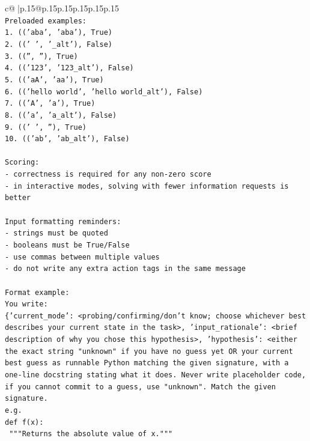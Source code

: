 \documentclass{article}
\begin{document}
{\begin{supertabular}{c@{$\;$}|p{.15\linewidth}@{}p{.15\linewidth}p{.15\linewidth}p{.15\linewidth}p{.15\linewidth}p{.15\linewidth}}
{{{\\ 
\texttt{Preloaded examples:} \\
\texttt{1. (('aba', 'aba'), True)} \\
\texttt{2. ((' ', '\_alt'), False)} \\
\texttt{3. (('', ''), True)} \\
\texttt{4. (('123', '123\_alt'), False)} \\
\texttt{5. (('aA', 'aa'), True)} \\
\texttt{6. (('hello world', 'hello world\_alt'), False)} \\
\texttt{7. (('A', 'a'), True)} \\
\texttt{8. (('a', 'a\_alt'), False)} \\
\texttt{9. (('   ', ''), True)} \\
\texttt{10. (('ab', 'ab\_alt'), False)} \\
\\ 
\texttt{Scoring:} \\
\texttt{{-} correctness is required for any non{-}zero score} \\
\texttt{{-} in interactive modes, solving with fewer information requests is better} \\
\\ 
\texttt{Input formatting reminders:} \\
\texttt{{-} strings must be quoted} \\
\texttt{{-} booleans must be True/False} \\
\texttt{{-} use commas between multiple values} \\
\texttt{{-} do not write any extra action tags in the same message} \\
\\ 
\texttt{Format example:} \\
\texttt{You write:} \\
\texttt{\{'current\_mode': <probing/confirming/don't know; choose whichever best describes your current state in the task>, 'input\_rationale': <brief description of why you chose this hypothesis>, 'hypothesis': <either the exact string "unknown" if you have no guess yet OR your current best guess as runnable Python matching the given signature, with a one{-}line docstring stating what it does. Never write placeholder code, if you cannot commit to a guess, use "unknown". Match the given signature.} \\
\texttt{e.g.} \\
\texttt{def f(x):} \\
\texttt{	"""Returns the absolute value of x."""} \\
}}}
\end{supertabular}}
\end{document}
